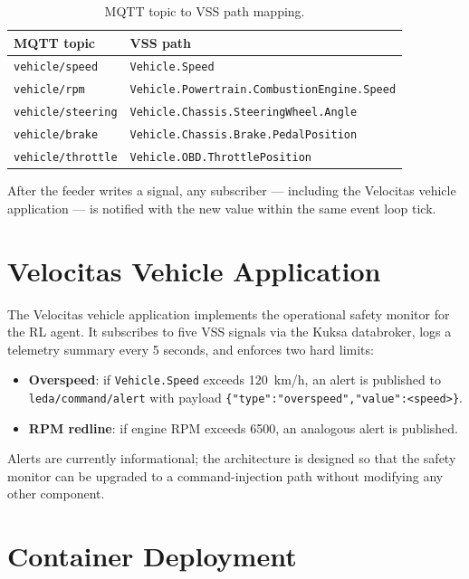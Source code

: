 \begin{table}[H]
\caption{MQTT topic to VSS path mapping.}
\label{table:vss-map}
\begin{tabular}{|p{5cm}|p{7cm}|}
  \hline
  \textbf{MQTT topic} & \textbf{VSS path} \\
  \hline
  \nolinkurl{vehicle/speed}    & \nolinkurl{Vehicle.Speed} \\
  \hline
  \nolinkurl{vehicle/rpm}      & \nolinkurl{Vehicle.Powertrain.CombustionEngine.Speed} \\
  \hline
  \nolinkurl{vehicle/steering} & \nolinkurl{Vehicle.Chassis.SteeringWheel.Angle} \\
  \hline
  \nolinkurl{vehicle/brake}    & \nolinkurl{Vehicle.Chassis.Brake.PedalPosition} \\
  \hline
  \nolinkurl{vehicle/throttle} & \nolinkurl{Vehicle.OBD.ThrottlePosition} \\
  \hline
\end{tabular}
\end{table}

After the feeder writes a signal, any subscriber --- including the
Velocitas vehicle application --- is notified with the new value within
the same event loop tick.

\section{Velocitas Vehicle Application}
\label{sec:velocitas}

The Velocitas vehicle application \cite{EclipseVelocitas2024}
implements the operational safety monitor for the RL agent. It subscribes
to five VSS signals via the Kuksa databroker, logs a telemetry summary
every 5 seconds, and enforces two hard limits:
\begin{itemize}[topsep=1.15pt,itemsep=1.15pt]
  \item \textbf{Overspeed}: if \texttt{Vehicle.Speed} exceeds 120~km/h,
    an alert is published to \texttt{leda/command/alert} with payload
    \texttt{\{"type":"overspeed","value":<speed>\}}.
  \item \textbf{RPM redline}: if engine RPM exceeds 6500, an analogous
    alert is published.
\end{itemize}
Alerts are currently informational; the architecture is designed so that
the safety monitor can be upgraded to a command-injection path without
modifying any other component.

\section{Container Deployment}
\label{sec:containers}

